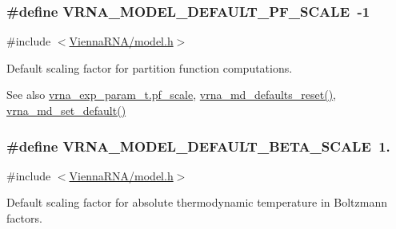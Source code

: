 \subsubsection[{V\+R\+N\+A\+\_\+\+M\+O\+D\+E\+L\+\_\+\+D\+E\+F\+A\+U\+L\+T\+\_\+\+P\+F\+\_\+\+S\+C\+A\+L\+E}]{\setlength{\rightskip}{0pt plus 5cm}\#define V\+R\+N\+A\+\_\+\+M\+O\+D\+E\+L\+\_\+\+D\+E\+F\+A\+U\+L\+T\+\_\+\+P\+F\+\_\+\+S\+C\+A\+L\+E~-\/1}\label{group__model__details_ga5505389cba74a18bbc116d2bb20256fa}


{\ttfamily \#include $<$\hyperlink{model_8h}{Vienna\+R\+N\+A/model.\+h}$>$}



Default scaling factor for partition function computations. 

\begin{DoxySeeAlso}{See also}
\hyperlink{group__energy__parameters_a53c12f0d74f94ce371e0471a8ab5a377}{vrna\+\_\+exp\+\_\+param\+\_\+t.\+pf\+\_\+scale}, \hyperlink{group__model__details_ga70834424cf804d149937de89f80ceb45}{vrna\+\_\+md\+\_\+defaults\+\_\+reset()}, \hyperlink{group__model__details_ga8ac6ff84936282436f822644bf841f66}{vrna\+\_\+md\+\_\+set\+\_\+default()} 
\end{DoxySeeAlso}
\hypertarget{group__model__details_ga383d3ac8d08c3b6221754b50871c1200}{}
\subsubsection[{V\+R\+N\+A\+\_\+\+M\+O\+D\+E\+L\+\_\+\+D\+E\+F\+A\+U\+L\+T\+\_\+\+B\+E\+T\+A\+\_\+\+S\+C\+A\+L\+E}]{\setlength{\rightskip}{0pt plus 5cm}\#define V\+R\+N\+A\+\_\+\+M\+O\+D\+E\+L\+\_\+\+D\+E\+F\+A\+U\+L\+T\+\_\+\+B\+E\+T\+A\+\_\+\+S\+C\+A\+L\+E~1.}\label{group__model__details_ga383d3ac8d08c3b6221754b50871c1200}


{\ttfamily \#include $<$\hyperlink{model_8h}{Vienna\+R\+N\+A/model.\+h}$>$}



Default scaling factor for absolute thermodynamic temperature in Boltzmann factors. 

